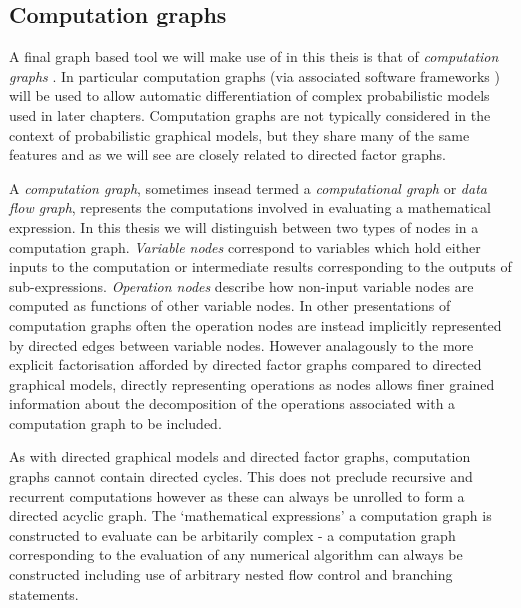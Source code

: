 
\subsection{Computation graphs}\label{subsec:computation-graphs}

A final graph based tool we will make use of in this theis is that of \emph{computation graphs} \citep{bauer1974computational}. In particular computation graphs (via associated software frameworks \citep{theano2016theano}) will be used to allow automatic differentiation of complex probabilistic models used in later chapters. Computation graphs are not typically considered in the context of probabilistic graphical models, but they share many of the same features and as we will see are closely related to directed factor graphs.

A \emph{computation graph}, sometimes insead termed a \emph{computational graph} or \emph{data flow graph}, represents the computations involved in evaluating a mathematical expression. In this thesis we will distinguish between two types of nodes in a computation graph. \emph{Variable nodes} correspond to variables which hold either inputs to the computation or intermediate results corresponding to the outputs of sub-expressions. \emph{Operation nodes} describe how non-input variable nodes are computed as functions of other variable nodes. In other presentations of computation graphs often the operation nodes are instead implicitly represented by directed edges between variable nodes. However analagously to the more explicit factorisation afforded by directed factor graphs compared to directed graphical models, directly representing operations as nodes allows finer grained information about the decomposition of the operations associated with a computation graph to be included.

As with directed graphical models and directed factor graphs, computation graphs cannot contain directed cycles. This does not preclude recursive and recurrent computations however as these can always be unrolled to form a directed acyclic graph. The `mathematical expressions' a computation graph is constructed to evaluate can be arbitarily complex - a computation graph corresponding to the evaluation of any numerical algorithm can always be constructed including use of arbitrary nested flow control and branching statements.

